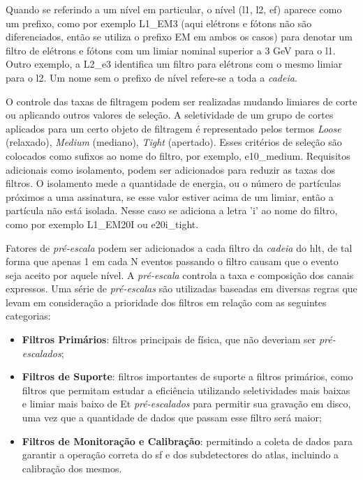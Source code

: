 Quando se referindo a um nível em particular, o nível (\gls{l1}, \gls{l2},
\gls{ef}) aparece como um prefixo, como por exemplo L1\_EM3 (aqui elétrons e
fótons não são diferenciados, então se utiliza o prefixo EM em ambos os casos)
para denotar um filtro de elétrons e fótons com um limiar nominal superior a 3
GeV para o \gls{l1}. Outro exemplo, a L2\_e3 identifica um filtro para elétrons
com o mesmo limiar para o \gls{l2}. Um nome sem o prefixo de nível
refere-se a toda a \emph{cadeia}.

O controle das taxas de filtragem podem ser realizadas mudando limiares de corte ou
aplicando outros valores de seleção. A seletividade de um grupo de cortes
aplicados para um certo objeto de filtragem é representado pelos termos
\emph{Loose} (relaxado), \emph{Medium} (mediano), \emph{Tight} (apertado). Esses
critérios de seleção são colocados como sufixos ao nome do filtro, por exemplo,
e10\_medium. Requisitos adicionais como isolamento, podem ser adicionados
para reduzir as taxas dos filtros. O isolamento mede a quantidade de energia, ou
o número de partículas próximos a uma assinatura, se esse valor estiver acima de
um limiar, então a partícula não está isolada. Nesse caso se adiciona a letra
'i' ao nome do filtro, como por exemplo L1\_EM20I ou e20i\_tight.

Fatores de \emph{pré-escala} podem ser adicionados a cada filtro da 
\emph{cadeia} do \gls{hlt}, de tal forma que apenas 1 em cada N eventos passando
o filtro causam que o evento seja aceito por aquele nível. A \emph{pré-escala}
controla a taxa e composição dos canais expressos. Uma série de
\emph{pré-escalas} são utilizadas baseadas em diversas regras que levam em
consideração a prioridade dos filtros em relação com as seguintes categorias:

\begin{itemize}
\item \textbf{Filtros Primários}: filtros principais de física, que não deveriam
ser \emph{pré-escalados};
\item \textbf{Filtros de Suporte}: filtros importantes de suporte a filtros
primários, como filtros que permitam estudar a eficiência utilizando 
seletividades mais baixas e limiar mais baixo de \gls{Et} \emph{pré-escalados}
para permitir sua gravação em disco, uma vez que a quantidade de dados que
passam esse filtro será maior;
\item \textbf{Filtros de Monitoração e Calibração}: permitindo a coleta de dados
para garantir a operação correta do \gls{sf} e dos subdetectores do \gls{atlas},
incluindo a calibração dos mesmos. 
\end{itemize}

